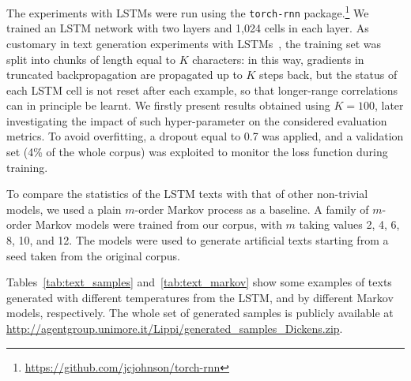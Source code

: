 \documentclass[journal]{IEEEtran}
\begin{document}
The experiments with LSTMs were run using the \texttt{torch-rnn}
package.\footnote{\url{https://github.com/jcjohnson/torch-rnn}}
%
We trained an LSTM network with two layers and 1,024 cells in each layer. As
customary in text generation experiments with
LSTMs~\cite{Karpathy2015understanding}, the training set was split into chunks
of length equal to $K$ characters: in this way, gradients in truncated
backpropagation are propagated up to $K$ steps back, but the status of each LSTM
cell is not reset after each example, so that longer-range correlations can in
principle be learnt. We firstly present results obtained using $K=100$, later investigating the impact of such hyper-parameter on the considered evaluation metrics.
To avoid overfitting, a dropout equal to 0.7 was applied, and a validation set (4\% of the whole corpus) was exploited to
monitor the loss function during training.

To compare the statistics of the LSTM texts with that of other
non-trivial models, we used a plain $m$-order Markov process as a baseline. A family of $m$-order Markov models were trained from our corpus, with $m$ taking values 2, 4, 6, 8, 10, and 12. The models
were used to generate artificial texts starting from a seed taken from the
original corpus.

Tables~\ref{tab:text_samples} and~\ref{tab:text_markov} show some examples of
texts generated with different temperatures from the LSTM, and by different
Markov models, respectively.
The whole set of generated samples is publicly available at \url{http://agentgroup.unimore.it/Lippi/generated_samples_Dickens.zip}.
\end{document}
